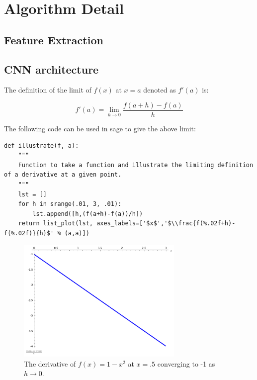 \documentclass[a4paper]{article}
\begin{document}
\section{Algorithm Detail}\label{algoDetail}

\subsection{Feature Extraction}

\subsection{CNN architecture}

The definition of the limit of $f(x)$ at $x=a$ denoted as $f'(a)$ is:

\begin{equation}
f'(a) = \lim_{h\to0}\frac{f(a+h)-f(a)}{h}
\end{equation}

The following code can be used in sage to give the above limit:

\begin{verbatim}
def illustrate(f, a):
    """
    Function to take a function and illustrate the limiting definition of a derivative at a given point.
    """
    lst = []
    for h in srange(.01, 3, .01):
    	lst.append([h,(f(a+h)-f(a))/h])
    return list_plot(lst, axes_labels=['$x$','$\\frac{f(%.02f+h)-f(%.02f)}{h}$' % (a,a)])
\end{verbatim}

\begin{figure}[!htbp]
\begin{center}
\includegraphics[width=8cm]{sage1.png}
\end{center}
\caption{The derivative of $f(x)=1-x^2$ at $x=.5$ converging to -1 as $h\to0$.}
\end{figure}
\end{document}
